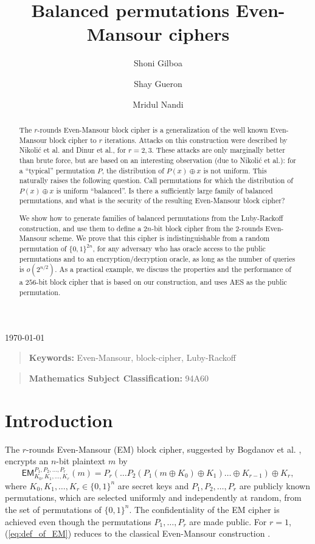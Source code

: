 \documentclass{llncs}
\title{Balanced permutations Even-Mansour ciphers}
\author{Shoni Gilboa \inst {1}  \and Shay Gueron \inst {2, 3} \and Mridul Nandi \inst {4}}
\institute{
The Open University of Israel, Raanana 43107, Israel
\and
University of Haifa, Israel
\and
Intel Corporation, Israel Development Center, Israel
\and
Indian Statistical Institute, Kolkata
}
\newcommand{\s}{\{0,1\}}
\begin{document}
\maketitle
\centerline{\today}

\begin{abstract}
The $r$-rounds Even-Mansour block cipher is a generalization of the well known Even-Mansour block cipher to $r$ iterations. 
Attacks on this construction were described by Nikoli{\'c} et al. and Dinur et al., for $r = 2, 3$.
These attacks are only marginally better than brute force, but are based on an interesting observation (due to Nikoli{\'c} et al.): for a ``typical'' permutation $P$, the distribution of  $P(x) \oplus x$ is not uniform.
This naturally raises the following question. Call permutations for which the distribution of $P(x) \oplus x$ is uniform ``balanced''. 
Is there a sufficiently large family of balanced permutations, and what is the security of the resulting Even-Mansour block cipher?

We show how to generate families of balanced permutations from the Luby-Rackoff construction, and use them to define a $2n$-bit block cipher from the $2$-rounds Even-Mansour scheme.
We prove that this cipher is indistinguishable from a random permutation of $\{0, 1\}^{2n}$, for any adversary who has oracle access to the public permutations and to an encryption/decryption oracle, as long as the number of queries is $o (2^{n/2})$. As a practical example, we discuss the properties and the performance of a $256$-bit block cipher that is based on our construction, and uses AES as the public permutation.
\end{abstract}

{\small
\begin{quote}
\textbf{Keywords:} Even-Mansour, block-cipher, Luby-Rackoff
\end{quote}}

{\small
\begin{quote}
\textbf{Mathematics Subject Classification:} 94A60
\end{quote}}

\section{Introduction}\label{intro}
The $r$-rounds Even-Mansour (EM) block cipher, suggested by Bogdanov et al. \cite{BKLSST}, encrypts an $n$-bit plaintext $m$ by 
\begin{equation}\label{eq:def_of_EM}
\textsf{EM}^{P_1,P_2,\ldots,P_r}_{K_0,K_1,\ldots,K_r}(m)=P_r(\ldots P_2(P_1(m\oplus K_0)\oplus K_1)\ldots\oplus K_{r-1})\oplus K_r,
\end{equation}
where $K_0,K_1,\ldots,K_r \in \{0, 1\}^n$ are secret keys and $P_1,P_2,\ldots,P_r$ are publicly known permutations, which are selected uniformly and independently at random, from the set of permutations of $\s^{n}$. 
The confidentiality of the EM cipher is achieved even though the permutations $P_1, \ldots, P_r$ are made public. 
For $r=1$, (\ref{eq:def_of_EM}) reduces to the classical Even-Mansour construction \cite{EM}.  
\end{document}
